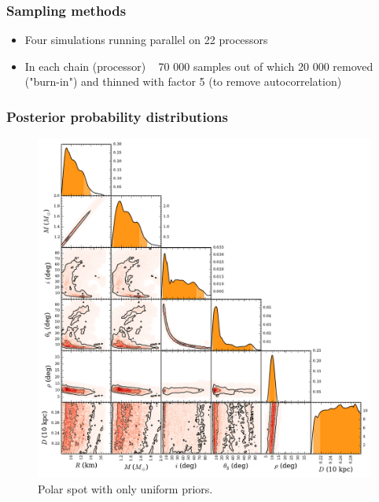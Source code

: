 \documentclass{beamer}
\begin{document}

\begin{frame}
\frametitle{Sampling methods}
\begin{itemize}
\item Four simulations running parallel on 22 processors
\item In each chain (processor) ~ 70 000 samples out of which 20 000 removed ("burn-in") and thinned with factor 5 (to remove autocorrelation)

\end{itemize}

\end{frame}

\fi

\begin{frame}
\frametitle{Posterior probability distributions}

\begin{figure}
\includegraphics[width=0.55\linewidth]{fpolf.pdf}
\caption{Polar spot with only uniform priors.}
\end{figure}

\end{frame}


\end{document}
